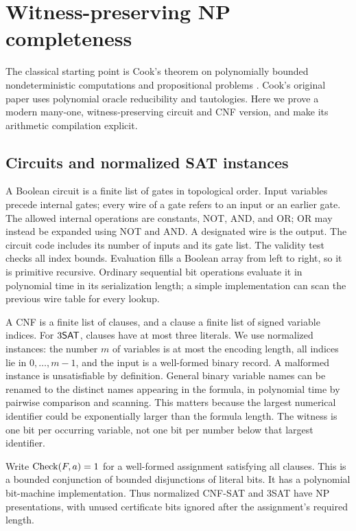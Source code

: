 \section{Witness-preserving NP completeness}
\label{sec:cook}

The classical starting point is Cook's theorem on polynomially bounded
nondeterministic computations and propositional problems \cite{Cook1971}.
Cook's original paper uses polynomial oracle reducibility and tautologies.
Here we prove a modern many-one, witness-preserving circuit and CNF version,
and make its arithmetic compilation explicit.

\subsection{Circuits and normalized SAT instances}

A Boolean circuit is a finite list of gates in topological order. Input
variables precede internal gates; every wire of a gate refers to an input or
an earlier gate. The allowed internal operations are constants, NOT, AND,
and OR; OR may instead be expanded using NOT and AND. A designated wire is
the output. The circuit code includes its number of inputs and its gate
list. The validity test checks all index bounds. Evaluation fills a Boolean
array from left to right, so it is primitive recursive. Ordinary sequential
bit operations evaluate it in polynomial time in its serialization length;
a simple implementation can scan the previous wire table for every lookup.

A CNF is a finite list of clauses, and a clause a finite list of signed
variable indices. For \(3\SAT\), clauses have at most three literals.
We use normalized instances: the number \(m\) of variables is at most the
encoding length, all indices lie in \(0,\ldots,m-1\), and the input is a
well-formed binary record. A malformed instance is unsatisfiable by
definition. General binary variable names can be renamed to the distinct
names appearing in the formula, in polynomial time by pairwise comparison
and scanning. This matters because the largest numerical identifier could
be exponentially larger than the formula length. The witness is one bit per
occurring variable, not one bit per number below that largest identifier.

Write \(\Check(F,a)=1\) for a well-formed assignment satisfying all clauses.
This is a bounded conjunction of bounded disjunctions of literal bits. It has
a polynomial bit-machine implementation. Thus normalized CNF-SAT and 3SAT
have NP presentations, with unused certificate bits ignored after the
assignment's required length.

